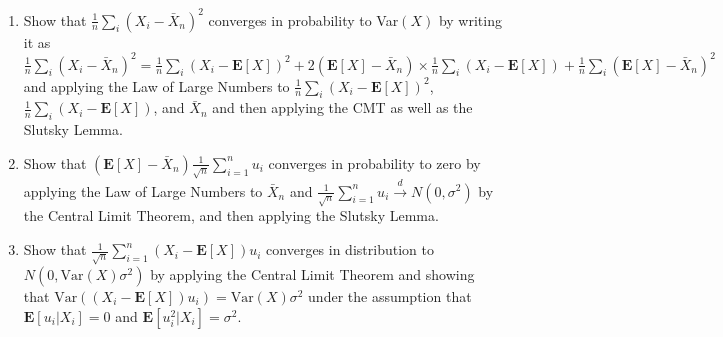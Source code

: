 \documentclass[11pt]{article}
\newcommand{\Blue}{\color{blue}}
\begin{document}
\begin{enumerate}
\begin{enumerate}
\begin{enumerate}
	\item Show that $\frac{1}{n}\sum_i (X_i-\bar X_n)^2$ converges in probability to Var$(X)$ by writing it as $\frac{1}{n}\sum_i (X_i-\bar X_n)^2=\frac{1}{n}\sum_i (X_i-\mathbf{E}[X])^2+ 2(\mathbf{E}[X]-\bar X_n)\times \frac{1}{n}\sum_i(X_i-\mathbf{E}[X])  + \frac{1}{n}\sum_i (\mathbf{E}[X]-\bar X_n)^2$ and applying the Law of Large Numbers to $\frac{1}{n}\sum_i (X_i-\mathbf{E}[X])^2$, $\frac{1}{n}\sum_i(X_i-\mathbf{E}[X])$, and $\bar X_n$ and then applying the CMT as well as the Slutsky Lemma.
	\item  Show that $( \mathbf{E}[X]  -\bar X_n)\frac{1}{\sqrt{n}} \sum_{i=1}^n u_i$ converges in probability to zero by  applying the Law of Large Numbers to $\bar X_n$ and $\frac{1}{\sqrt{n}} \sum_{i=1}^n u_i \overset{d}{\rightarrow} N(0,\sigma^2)$ by the Central Limit Theorem, and then applying the Slutsky Lemma.
	\item Show that $\frac{1}{\sqrt{n}} \sum_{i=1}^n (X_i-\mathbf{E}[X])u_i$ converges in distribution to $N(0,\text{Var}(X)\sigma^2)$ by applying the Central Limit Theorem and showing that $\text{Var}((X_i-\mathbf{E}[X])u_i)=\text{Var}(X)\sigma^2$ under the assumption that $\mathbf{E}[u_i|X_i]=0$  and $\mathbf{E}[u_i^2|X_i] = \sigma^2$.

\end{enumerate}
\end{enumerate}
\end{enumerate}
\end{document}
